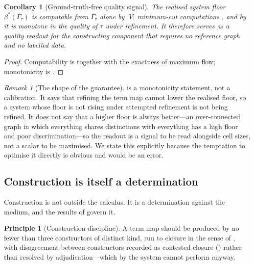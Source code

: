 \documentclass[11pt,twocolumn,a4paper]{article}
\theoremstyle{dirthm}
\newtheorem{corollary}[theorem]{Corollary}
\theoremstyle{definition}
\newtheorem{principle}[theorem]{Principle}
\theoremstyle{remark}
\newtheorem{remark}[theorem]{Remark}
\newcommand{\Gph}{\Gamma}
\newcommand{\V}{V}
\newcommand{\flo}{\beta}
\newcommand{\terms}{\tau}
\newcommand{\abs}[1]{\lvert#1\rvert}
\begin{document}
\begin{corollary}[Ground-truth-free quality signal]
\label{cor:quality-signal}
The realised system floor $\flo^{\ast}(\Gph_\terms)$ is computable from
$\Gph_\terms$ alone by $\abs{\V}$ minimum-cut computations
\citep{fordfulkerson1956,stoer1997}, and by  it is
monotone in the quality of $\terms$ under refinement. It therefore serves as
a quality readout for the constructing component that requires no reference
graph and no labelled data.
\end{corollary}

\begin{proof}
Computability is  together with the exactness of maximum
flow; monotonicity is .
\end{proof}

\begin{remark}[The shape of the guarantee]
\label{rem:quality-honest}
 is a monotonicity statement, not a calibration.
It says that refining the term map cannot lower the realised floor, so a
system whose floor is not rising under attempted refinement is not being
refined. It does not say that a higher floor is always better---an
over-connected graph in which everything shares distinctions with everything
has a high floor and poor discrimination---so the readout is a signal to be
read alongside cell sizes, not a scalar to be maximised. We state this
explicitly because the temptation to optimise it directly is obvious and
would be an error.
\end{remark}

\subsection{Construction is itself a determination}

Construction is not outside the calculus. It is a determination against the
medium, and the results of  govern it.

\begin{principle}[Construction discipline]
\label{prin:construction}
A term map should be produced by no fewer than three constructors of distinct
kind, run to closure in the sense of , with disagreement
between constructors recorded as contested closure
() rather than resolved by adjudication---which by
 the system cannot perform anyway.
\end{principle}
\end{document}
